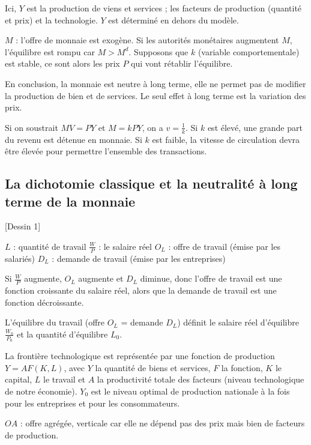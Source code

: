 	Ici, $Y$ est la production de viens et services ; les facteurs de production (quantité et prix) et la technologie. $Y$ est déterminé en dehors du modèle.
	
	$M$ : l'offre de monnaie est exogène. Si les autorités monétaires augmentent $M$, l'équilibre est rompu car $M > M^d$. Supposons que $k$ (variable comportementale) est stable, ce sont alors les prix $P$ qui vont rétablir l'équilibre.
	
	En conclusion, la monnaie est neutre à long terme, elle ne permet pas de modifier la production de bien et de services. Le seul effet à long terme est la variation des prix.
	
	Si on soustrait $MV = PY$ et $M = kPY$, on a $v = \frac{1}{k}$. Si $k$ est élevé, une grande part du revenu est détenue en monnaie. Si $k$ est faible, la  vitesse de circulation devra être élevée pour permettre l'ensemble des transactions.
	
	\subsection{La dichotomie classique et la neutralité à long terme de la monnaie}
	
	[Dessin 1]
	
	$L$ : quantité de travail
	$\frac{W}{P}$ : le salaire réel
	$O_L$ : offre de travail (émise par les salariés)
	$D_L$ : demande de travail (émise par les entreprises)
	
	Si $\frac{W}{P}$ augmente, $O_L$ augmente et $D_L$ diminue, donc l'offre de travail est une fonction croissante du salaire réel, alors que la demande de travail est une fonction décroissante.
	
	L'équilibre du travail (offre $O_L$ = demande $D_L$) définit le salaire réel d'équilibre $\frac{W_0}{P_0}$ et la quantité d'équilibre $L_0$.
	
	La frontière technologique est représentée par une fonction de production $Y = A F(K, L)$, avec $Y$ la quantité de biens et services, $F$ la fonction, $K$ le capital, $L$ le travail et $A$ la productivité totale des facteurs (niveau technologique de notre économie). $Y_0$ est le niveau optimal de production nationale à la fois pour les entreprises et pour les consommateurs.                                                                                                                                                                            
	
	$OA$ : offre agrégée, verticale car elle ne dépend pas des prix mais bien de facteurs de production.
	
